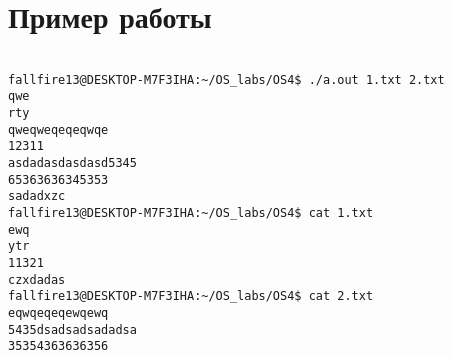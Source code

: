 \section{Пример работы}

\begin{verbatim}

fallfire13@DESKTOP-M7F3IHA:~/OS_labs/OS4$ ./a.out 1.txt 2.txt
qwe
rty
qweqweqeqeqwqe
12311
asdadasdasdasd5345
65363636345353
sadadxzc
fallfire13@DESKTOP-M7F3IHA:~/OS_labs/OS4$ cat 1.txt
ewq
ytr
11321
czxdadas
fallfire13@DESKTOP-M7F3IHA:~/OS_labs/OS4$ cat 2.txt
eqwqeqeqewqewq
5435dsadsadsadadsa
35354363636356

\end{verbatim}

\pagebreak


